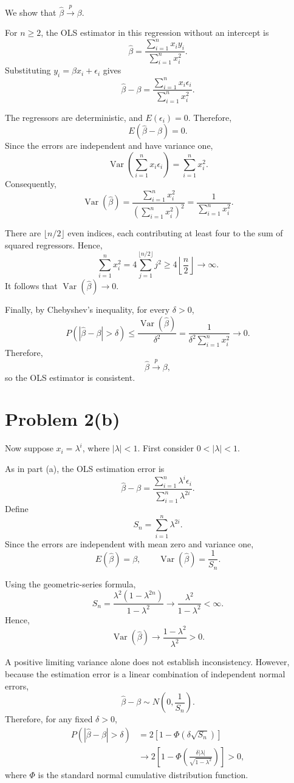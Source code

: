 \documentclass[11pt]{article}
\begin{document}
We show that $\widehat{\beta}\xrightarrow{p}\beta$.

For $n\geq2$, the OLS estimator in this regression
without an intercept is
\[
\widehat{\beta}
=\frac{\sum_{i=1}^n x_i y_i}
       {\sum_{i=1}^n x_i^2}.
\]
Substituting $y_i=\beta x_i+\epsilon_i$ gives
\[
\widehat{\beta}-\beta
=\frac{\sum_{i=1}^n x_i\epsilon_i}
       {\sum_{i=1}^n x_i^2}.
\]

The regressors are deterministic, and
$E(\epsilon_i)=0$. Therefore,
\[
E(\widehat{\beta}-\beta)=0.
\]
Since the errors are independent and have
variance one,
\[
\operatorname{Var}\left(
\sum_{i=1}^n x_i\epsilon_i
\right)
=\sum_{i=1}^n x_i^2.
\]
Consequently,
\[
\operatorname{Var}(\widehat{\beta})
=\frac{\sum_{i=1}^n x_i^2}
       {\left(\sum_{i=1}^n x_i^2\right)^2}
=\frac{1}{\sum_{i=1}^n x_i^2}.
\]

There are $\lfloor n/2\rfloor$ even indices,
each contributing at least four to the sum
of squared regressors. Hence,
\[
\sum_{i=1}^n x_i^2
=4\sum_{j=1}^{\lfloor n/2\rfloor}j^2
\geq4\left\lfloor\frac n2\right\rfloor
\longrightarrow\infty.
\]
It follows that
$\operatorname{Var}(\widehat{\beta})\to0$.

Finally, by Chebyshev's inequality, for every
$\delta>0$,
\[
P\left(
|\widehat{\beta}-\beta|>\delta
\right)
\leq
\frac{\operatorname{Var}(\widehat{\beta})}{\delta^2}
=
\frac{1}{\delta^2\sum_{i=1}^n x_i^2}
\longrightarrow0.
\]
Therefore,
\[
\boxed{\widehat{\beta}\xrightarrow{p}\beta,}
\]
so the OLS estimator is consistent.
\section*{Problem 2(b)}

Now suppose $x_i=\lambda^i$, where $|\lambda|<1$.
First consider $0<|\lambda|<1$.

As in part (a), the OLS estimation error is
\[
\widehat{\beta}-\beta
=\frac{\sum_{i=1}^n\lambda^i\epsilon_i}
       {\sum_{i=1}^n\lambda^{2i}}.
\]
Define
\[
S_n=\sum_{i=1}^n\lambda^{2i}.
\]
Since the errors are independent with mean zero
and variance one,
\[
E(\widehat{\beta})=\beta,
\qquad
\operatorname{Var}(\widehat{\beta})=\frac{1}{S_n}.
\]

Using the geometric-series formula,
\[
S_n
=\frac{\lambda^2(1-\lambda^{2n})}{1-\lambda^2}
\longrightarrow
\frac{\lambda^2}{1-\lambda^2}<\infty.
\]
Hence,
\[
\operatorname{Var}(\widehat{\beta})
\longrightarrow
\frac{1-\lambda^2}{\lambda^2}>0.
\]

A positive limiting variance alone does not
establish inconsistency. However, because the
estimation error is a linear combination of
independent normal errors,
\[
\widehat{\beta}-\beta
\sim N\left(0,\frac{1}{S_n}\right).
\]
Therefore, for any fixed $\delta>0$,
\[
\begin{aligned}
P\left(|\widehat{\beta}-\beta|>\delta\right)
&=2\left[1-\Phi\left(\delta\sqrt{S_n}\right)\right]\\
&\longrightarrow
2\left[
1-\Phi\left(
\frac{\delta|\lambda|}{\sqrt{1-\lambda^2}}
\right)
\right]
>0,
\end{aligned}
\]
where $\Phi$ is the standard normal cumulative
distribution function.
\end{document}
